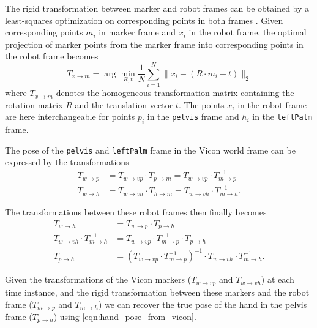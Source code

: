 The rigid transformation between marker and robot frames can be obtained by a least-squares optimization on corresponding points in both frames \cite{Umeyama1991}. Given corresponding points $m_i$ in marker frame and $x_i$ in the robot frame, the optimal projection of marker points from the marker frame into corresponding points in the robot frame becomes
\begin{equation}
T_{x \rightarrow m} = \arg\min_{R,t} \frac{1}{N} \sum_{i=1}^N \lVert x_i - \left( R \cdot m_i + t \right) \rVert_2
\label{eqn:least_squares_transformation_estimation}
\end{equation}
where $T_{x \rightarrow m}$ denotes the homogeneous transformation matrix containing the rotation matrix $R$ and the translation vector $t$. The points $x_i$ in the robot frame are here interchangeable for points $p_i$ in the \texttt{pelvis} frame and $h_i$ in the \texttt{leftPalm} frame.

The pose of the \texttt{pelvis} and \texttt{leftPalm} frame in the Vicon world frame can be expressed by the transformations
\begin{align}
T_{w \rightarrow p} &= T_{w \rightarrow vp} \cdot T_{p \rightarrow m} = T_{w \rightarrow vp} \cdot T_{m \rightarrow p}^{-1} \\
T_{w \rightarrow h} &= T_{w \rightarrow vh} \cdot T_{h \rightarrow m} = T_{w \rightarrow vh} \cdot T_{m \rightarrow h}^{-1} .
\end{align}

The transformations between these robot frames then finally becomes
\begin{align}
T_{w \rightarrow h} &= T_{w \rightarrow p} \cdot T_{p \rightarrow h} \\
T_{w \rightarrow vh} \cdot T_{m \rightarrow h}^{-1} &= T_{w \rightarrow vp} \cdot T_{m \rightarrow p}^{-1} \cdot T_{p \rightarrow h} \nonumber \\
T_{p \rightarrow h} &= \left( T_{w \rightarrow vp} \cdot T_{m \rightarrow p}^{-1} \right)^{-1} \cdot T_{w \rightarrow vh} \cdot T_{m \rightarrow h}^{-1} \label{eqn:hand_pose_from_vicon} .
\end{align}

Given the transformations of the Vicon markers ($T_{w \rightarrow vp}$ and $T_{w \rightarrow vh}$) at each time instance, and the rigid transformation between these markers and the robot frame ($T_{m \rightarrow p}$ and $T_{m \rightarrow h}$) we can recover the true pose of the hand in the pelvis frame ($T_{p \rightarrow h}$) using \cref{eqn:hand_pose_from_vicon}.


